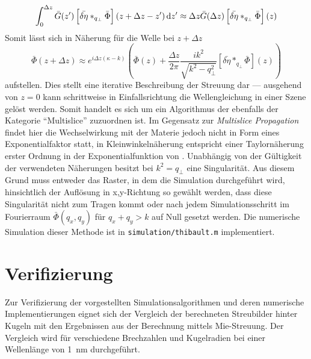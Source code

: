 \begin{equation}
	\int_{0}^{\Delta z} \bar{G}(z')\left[\bar{\delta\eta}\ast_{q_\perp} \bar{\Phi}\right](z+\Delta z-z')\dif z'
	\approx
	\Delta z \bar{G}(\Delta z)\left[\bar{\delta\eta}\ast_{q_\perp} \bar{\Phi}\right](z)
\end{equation}
Somit lässt sich in Näherung für die Welle bei $z+\Delta z$
\begin{equation}
	\label{eq:thibault}
	\bar{\Phi}(z+\Delta z)
	\approx
	e^{i\Delta z(\kappa-k)}
	\left(
	\bar{\Phi}(z)+\frac{\Delta z}{2\pi}\frac{ik^2}{\sqrt{k^2-q^2_\perp}}  \left[\bar{\delta\eta}\ast_{q_\perp} \bar{\Phi}\right](z)
	\right)
\end{equation}
aufstellen. Dies stellt eine iterative Beschreibung der Streuung dar --- ausgehend von $z=0$ kann schrittweise in Einfallsrichtung die Wellengleichung in einer Szene gelöst werden. Somit handelt es sich um ein Algorithmus der ebenfalls der Kategorie "`Multislice"' zuzuordnen ist. Im Gegensatz zur \textit{Multislice Propagation} findet hier die Wechselwirkung mit der Materie jedoch nicht in Form eines Exponentialfaktor statt, in Kleinwinkelnäherung entspricht  einer Taylornäherung erster Ordnung in der Exponentialfunktion von . Unabhängig von der Gültigkeit der verwendeten Näherungen besitzt  bei $k^2=q_\perp$ eine Singularität. Aus diesem Grund muss entweder das Raster, in dem die Simulation durchgeführt wird, hinsichtlich der Auflösung in x,y-Richtung so gewählt werden, dass diese Singularität nicht zum Tragen kommt oder nach jedem Simulationsschritt im Fourierraum $\bar{\Phi}(q_x,q_y)$ für $q_x+q_y>k$ auf Null gesetzt werden.
Die numerische Simulation dieser Methode ist in \texttt{simulation/thibault.m} implementiert.


\section{Verifizierung}
Zur Verifizierung der vorgestellten Simulationsalgorithmen und deren numerische Implementierungen eignet sich der Vergleich der berechneten Streubilder hinter Kugeln mit den Ergebnissen aus der Berechnung mittels Mie-Streuung. Der Vergleich wird für verschiedene Brechzahlen und Kugelradien bei einer Wellenlänge von \SI{1}{nm} durchgeführt.

